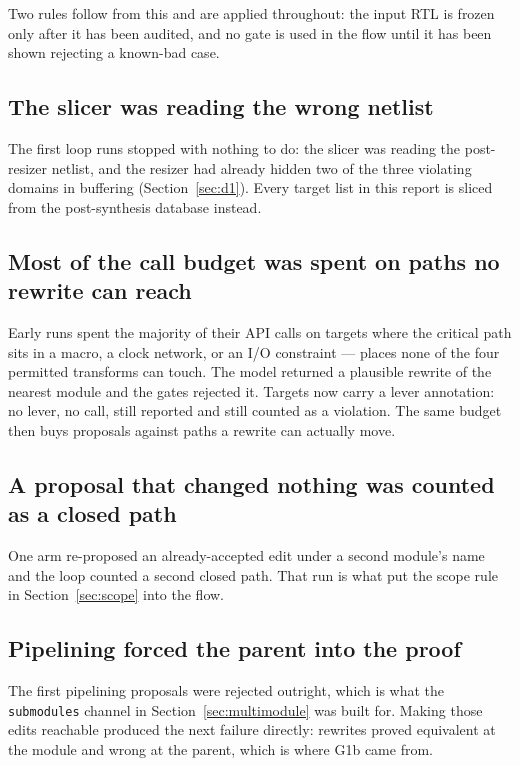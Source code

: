 \documentclass[11pt,a4paper]{article}
\begin{document}
Two rules follow from this and are applied throughout: the input RTL is frozen
only after it has been audited, and no gate is used in the flow until it has
been shown rejecting a known-bad case.

\subsection{The slicer was reading the wrong netlist}

The first loop runs stopped with nothing to do: the slicer was reading the
post-resizer netlist, and the resizer had already hidden two of the three
violating domains in buffering (Section~\ref{sec:d1}). Every target list in
this report is sliced from the post-synthesis database instead.

\subsection{Most of the call budget was spent on paths no rewrite can reach}

Early runs spent the majority of their API calls on targets where the critical
path sits in a macro, a clock network, or an I/O constraint --- places none of
the four permitted transforms can touch. The model returned a
plausible rewrite of the nearest module and the gates rejected it. Targets
now carry a lever annotation: no lever, no call, still reported and still
counted as a violation. The same budget then buys proposals against paths a
rewrite can actually move.

\subsection{A proposal that changed nothing was counted as a closed path}

One arm re-proposed an already-accepted edit under a second module's name and
the loop counted a second closed path. That run is what put the scope rule in
Section~\ref{sec:scope} into the flow.

\subsection{Pipelining forced the parent into the proof}

The first pipelining proposals were rejected outright, which is what the
\texttt{submodules} channel in Section~\ref{sec:multimodule} was built for.
Making those edits reachable produced the next failure directly: rewrites proved
equivalent at the module and wrong at the parent, which is where G1b came from.
\end{document}
